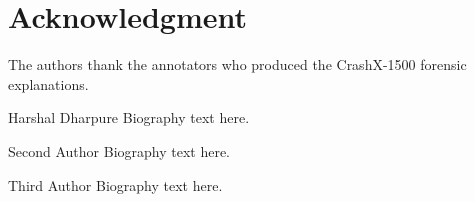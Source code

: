 \documentclass{ieeeaccess}
\newcommand{\dataset}{CrashX-1500}
\begin{document}
\section*{Acknowledgment}
The authors thank the annotators who produced the \dataset{} forensic explanations.




\begin{IEEEbiographynophoto}{Harshal Dharpure}
Biography text here.
\end{IEEEbiographynophoto}

\begin{IEEEbiographynophoto}{Second Author}
Biography text here.
\end{IEEEbiographynophoto}

\begin{IEEEbiographynophoto}{Third Author}
Biography text here.
\end{IEEEbiographynophoto}

\EOD
\end{document}

